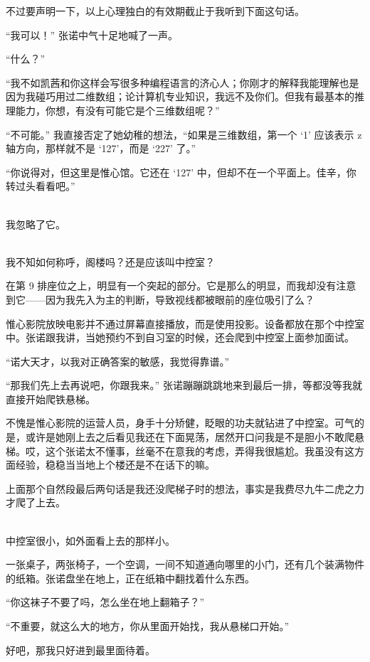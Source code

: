 \documentclass[UTF8]{ctexart}
\begin{document}
不过要声明一下，以上心理独白的有效期截止于我听到下面这句话。

“我可以！” 张诺中气十足地喊了一声。

“什么？”

“我不如凯茜和你这样会写很多种编程语言的济心人；你刚才的解释我能理解也是因为我碰巧用过二维数组；论计算机专业知识，我远不及你们。但我有最基本的推理能力，你想，有没有可能它是个三维数组呢？”

“不可能。” 我直接否定了她幼稚的想法，“如果是三维数组，第一个 ‘1’ 应该表示 z 轴方向，那样就不是 ‘127’，而是 ‘227’ 了。”

“你说得对，但这里是惟心馆。它还在 ‘127’ 中，但却不在一个平面上。佳辛，你转过头看看吧。”

~\\

我忽略了它。

~\\

我不知如何称呼，阁楼吗？还是应该叫中控室？

在第 9 排座位之上，明显有一个突起的部分。它是那么的明显，而我却没有注意到它——因为我先入为主的判断，导致视线都被眼前的座位吸引了么？

惟心影院放映电影并不通过屏幕直接播放，而是使用投影。设备都放在那个中控室中。张诺跟我讲，当她预约不到自习室的时候，还会爬到中控室上面参加面试。

“诺大天才，以我对正确答案的敏感，我觉得靠谱。”

“那我们先上去再说吧，你跟我来。” 张诺蹦蹦跳跳地来到最后一排，等都没等我就直接开始爬铁悬梯。

不愧是惟心影院的运营人员，身手十分矫健，眨眼的功夫就钻进了中控室。可气的是，或许是她刚上去之后看见我还在下面晃荡，居然开口问我是不是胆小不敢爬悬梯。哎，这个张诺太不懂事，丝毫不在意我的考虑，弄得我很尴尬。我虽没有这方面经验，稳稳当当地上个楼还是不在话下的嘛。

上面那个自然段最后两句话是我还没爬梯子时的想法，事实是我费尽九牛二虎之力才爬了上去。

~\\

中控室很小，如外面看上去的那样小。

一张桌子，两张椅子，一个空调，一间不知道通向哪里的小门，还有几个装满物件的纸箱。张诺盘坐在地上，正在纸箱中翻找着什么东西。

“你这袜子不要了吗，怎么坐在地上翻箱子？”

“不重要，就这么大的地方，你从里面开始找，我从悬梯口开始。”

好吧，那我只好进到最里面待着。
\end{document}

